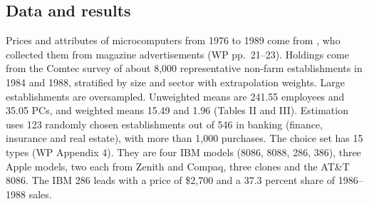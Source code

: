 \subsection{Data and results}\label{sec:07-hendel-results}

Prices and attributes of microcomputers from 1976 to 1989 come from \citet{BerndtGriliches1993}, who collected them
from magazine advertisements (WP pp.~21--23). Holdings come from the Comtec survey of about 8,000 representative
non-farm establishments in 1984 and 1988, stratified by size and sector with extrapolation weights. Large
establishments are oversampled. Unweighted means are 241.55 employees and 35.05 PCs, and weighted means 15.49 and
1.96 (Tables II and III). Estimation uses 123 randomly chosen establishments out of 546 in banking (finance,
insurance and real estate), with more than 1,000 purchases. The choice set has 15 types (WP Appendix 4). They are four IBM models (8086, 8088, 286,
386), three Apple models, two each from Zenith and Compaq, three clones and the AT\&T 8086. The IBM 286 leads with a price of \$2,700 and a 37.3 percent share of 1986--1988 sales.

